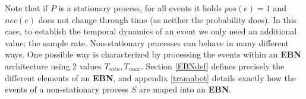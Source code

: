 \documentclass[
		twoside,openright,titlepage,numbers=noenddot,manychapters,
		headinclude,%
                footinclude=false,cleardoublepage=empty,
                BCOR=5mm,
		fontsize=11pt, %
                 enabledeprecatedfontcommands]{scrreprt}
\begin{document}
Note that if $P$ is a stationary process, for all events it holds $pos(e)=1$ and $nec(e)$ does not change through time (as neither the probability does). %
In this case, to establish the temporal dynamics of an event we only need an additional value: the sample rate. Non-stationary processes can behave in many different ways. One possible way is characterized by processing the events within an \textbf{EBN} architecture using 2 values $T_{min}, T_{max}$.
%
Section \ref{EBNdef} defines precisely the different elements of an \textbf{EBN}, and appendix \ref{tramabot} details exactly how the events of a non-stationary process $S$ are maped into an \textbf{EBN}. 
\end{document}

